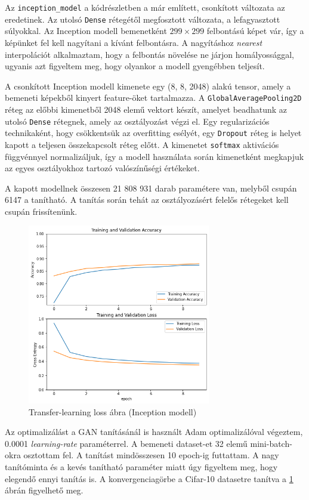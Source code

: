 Az \texttt{inception\_model} a kódrészletben a már említett, csonkított változata az eredetinek. Az utolsó \texttt{Dense} rétegétől megfosztott változata, a lefagyasztott súlyokkal. Az Inception modell bemenetként $299 \times 299$ felbontású képet vár, így a képünket fel kell nagyítani a kívánt felbontásra. A nagyításhoz \textit{nearest} interpolációt alkalmaztam, hogy a felbontás növelése ne járjon homályossággal, ugyanis azt figyeltem meg, hogy olyankor a modell gyengébben teljesít.

A csonkított Inception modell kimenete egy (8, 8, 2048) alakú tensor, amely a bemeneti képekből kinyert feature-öket tartalmazza. A \texttt{GlobalAveragePooling2D} réteg az előbbi kimenetből 2048 elemű vektort készít, amelyet beadhatunk az utolsó \texttt{Dense} rétegnek, amely az osztályozást végzi el. Egy regularizációs technikaként, hogy csökkentsük az overfitting esélyét, egy \texttt{Dropout} réteg is helyet kapott a teljesen összekapcsolt réteg előtt.
A kimenetet \texttt{softmax} aktivációs függvénnyel normalizáljuk, így a modell használata során kimenetként megkapjuk az egyes osztályokhoz tartozó valószínűségi értékeket.

A kapott modellnek összesen 21 808 931 darab paramétere van, melyből csupán 6147 a tanítható. A tanítás során tehát az osztályozásért felelős rétegeket kell csupán frissítenünk.

\begin{figure}[h]
	\centering
	\includegraphics[width=8cm]{images/transfer_inception.png}
	\caption{Transfer-learning loss ábra (Inception modell)}
	\label{fig:transfer_learning_loss}
\end{figure}

Az optimalizálást a GAN tanításánál is használt Adam optimalizálóval végeztem, 0.0001 \textit{learning-rate} paraméterrel. A bemeneti dataset-et 32 elemű mini-batch-okra osztottam fel. A tanítást mindösszesen 10 epoch-ig futtattam. A nagy tanítóminta és a kevés tanítható paraméter miatt úgy figyeltem meg, hogy elegendő ennyi tanítás is. A konvergenciagörbe a Cifar-10 datasetre tanítva a \ref{fig:transfer_learning_loss} ábrán figyelhető meg.

